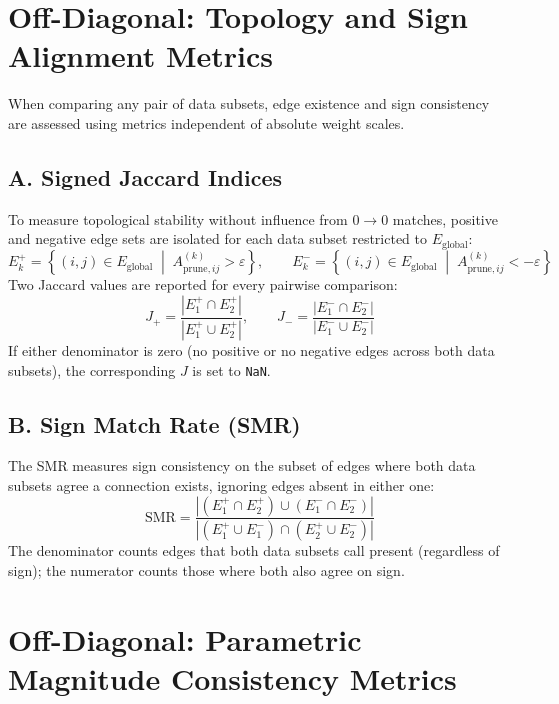 \documentclass[11pt]{article}
\begin{document}
\section{Off-Diagonal: Topology and Sign Alignment Metrics}

When comparing any pair of data subsets, edge existence and sign consistency are assessed using metrics independent of absolute weight scales.

\subsection*{A. Signed Jaccard Indices}

To measure topological stability without influence from $0 \to 0$ matches, positive and negative edge sets are isolated for each data subset restricted to $E_{\text{global}}$:
\[
E_k^+ = \left\{ (i,j) \in E_{\text{global}} \;\middle|\; A^{(k)}_{\text{prune}, ij} > \varepsilon \right\}, \qquad
E_k^- = \left\{ (i,j) \in E_{\text{global}} \;\middle|\; A^{(k)}_{\text{prune}, ij} < -\varepsilon \right\}
\]
Two Jaccard values are reported for every pairwise comparison:
\[
J_+ = \frac{|E_1^+ \cap E_2^+|}{|E_1^+ \cup E_2^+|}, \qquad
J_- = \frac{|E_1^- \cap E_2^-|}{|E_1^- \cup E_2^-|}
\]
If either denominator is zero (no positive or no negative edges across both data subsets), the corresponding $J$ is set to \texttt{NaN}.

\subsection*{B. Sign Match Rate (SMR)}

The SMR measures sign consistency on the subset of edges where both data subsets agree a connection exists, ignoring edges absent in either one:
\[
\text{SMR} = \frac{|(E_1^+ \cap E_2^+) \cup (E_1^- \cap E_2^-)|}{|(E_1^+ \cup E_1^-) \cap (E_2^+ \cup E_2^-)|}
\]
The denominator counts edges that both data subsets call present (regardless of sign); the numerator counts those where both also agree on sign.

\section{Off-Diagonal: Parametric Magnitude Consistency Metrics}
\end{document}
